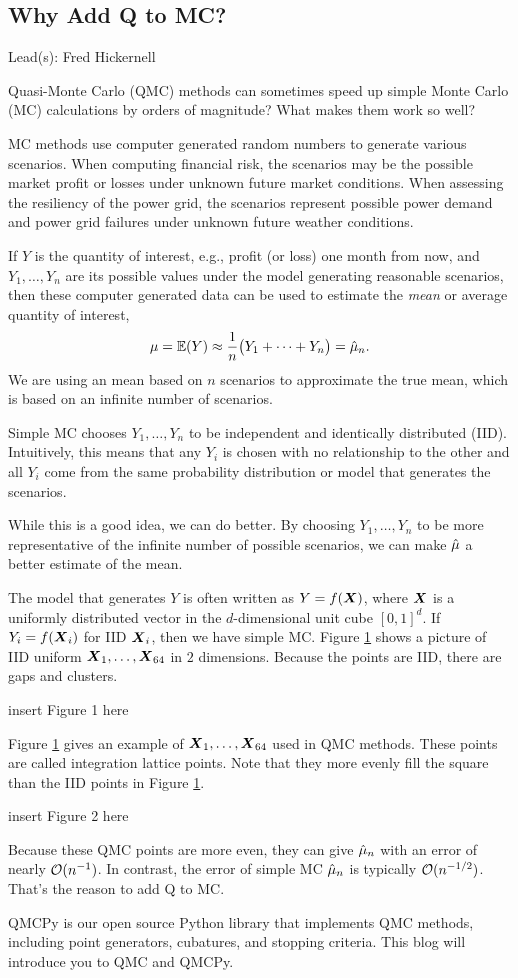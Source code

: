 \documentclass{article}
\newcommand{\blogpost}[3]{\begin{bibunit}[amsalpha]\newpage%
\section{#1} Lead(s): #2 \bigskip #3%
\putbib[FJH23,FJHown23]
\end{bibunit}%
} %
\begin{document}
\blogpost{Why Add Q to MC?}{Fred Hickernell}{\label{WhyQ}

Quasi-Monte Carlo (QMC) methods can sometimes speed up simple Monte Carlo (MC) calculations by orders of magnitude?  What makes them work so well?

MC methods use computer generated random numbers to generate various scenarios.  When computing financial risk, the scenarios may be the possible market profit or losses under unknown future market conditions.  When assessing the resiliency of the power grid, the scenarios represent possible power demand and power grid failures under unknown future weather conditions.

If $Y$ is the quantity of interest, e.g., profit (or loss) one month from now, and $Y_1, \ldots, Y_n$ are its possible values under the model generating reasonable scenarios, then these computer generated data can be used to estimate the \emph{mean} or average quantity of interest, 
\[
\mu = \operatorname{\mathbb{E}}(Y) \approx \frac 1n \bigl ( Y_1 + \cdots + Y_n \bigr) = \hat{\mu}_n.
\]
We are using an mean based on $n$ scenarios to approximate the true mean, which is based on an infinite number of scenarios.

Simple MC chooses $Y_1, \ldots, Y_n$ to be independent and identically distributed (IID).  Intuitively, this means that any $Y_i$ is chosen with no relationship to the other and all $Y_i$ come from the same probability distribution or model that generates the scenarios.

While this is a good idea, we can do better.  By choosing $Y_1, \ldots, Y_n$ to be more representative of the infinite number of possible scenarios, we can make $\hat{\mu}$ a better estimate of the mean.

The model that generates $Y$ is often written as $Y= f(\boldsymbol{X})$, where $\boldsymbol{X}$ is a uniformly distributed vector in the $d$-dimensional unit cube $[0,1]^d$.  If $Y_i = f(\boldsymbol{X}_i)$ for IID $\boldsymbol{X}_i$, then we have simple MC.  Figure \ref{} shows a picture of IID uniform  $\boldsymbol{X}_1, \ldots, \boldsymbol{X}_{64}$ in $2$ dimensions.  Because the points are IID, there are gaps and clusters.

insert Figure 1 here

Figure \ref{} gives an example of $\boldsymbol{X}_1, \ldots, \boldsymbol{X}_{64}$ used in QMC methods.  These points are called integration lattice points.  Note that they more evenly fill the square than the IID points in Figure \ref{}.

insert Figure 2 here

Because these QMC points  are more even, they can give $\hat{\mu}_n$ with an error of nearly $\operatorname{{\mathcal O}}(n^{-1})$.  In contrast, the error of simple MC $\hat{\mu}_n$ is typically $\operatorname{{\mathcal O}}(n^{-1/2})$.  That's the reason to add Q to MC.

QMCPy \cite{QMCPy2020a} is our open source Python library that implements QMC methods, including point generators, cubatures, and stopping criteria.  This blog will introduce you to QMC and QMCPy.
}
\end{document}
